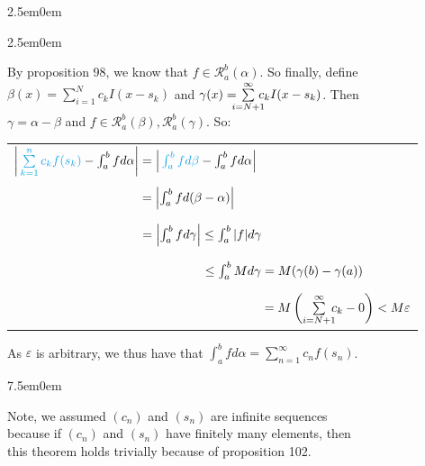 \documentclass{book}
\newcommand{\teachComment}{
   \color{Orange}%
   \fontsize{12}{14}\selectfont%
}
\newcommand{\cyPen}[1]{{\vphantom{.}\color{Cerulean}#1}}
\newenvironment{myIndent}{%
   \begin{adjustwidth}{2.5em}{0em}%
}{%
   \end{adjustwidth}%
}
\newenvironment{myTindent}{%
   \begin{adjustwidth}{7.5em}{0em}%
}{%
   \end{adjustwidth}%
}
\newcommand{\retTwo}{\hfill\bigbreak}
\begin{document}
{\begin{myIndent}
{\begin{myIndent}
      By proposition 98, we know that $f \in \mathscr{R}_a^b(\alpha)$. So finally, define\\
      $\beta(x) = \sum\limits_{i=1}^N c_k I(x - s_k)$ and $\gamma(x) = \hspace{-0.65em}\sum\limits_{i=N+1}^\infty\hspace{-0.65em} c_k I(x - s_k)$. Then\\ $\gamma = \alpha - \beta$ and $f \in \mathscr{R}_a^b(\beta), \mathscr{R}_a^b(\gamma)$. So:\\
      
      \begin{center}{\fontsize{12}{14}\selectfont
         \begin{tabular}{l}
            $\left|\cyPen{\sum\limits_{k=1}^n c_kf(s_k)}\vphantom{.} - \int_a^b fd\alpha\right| = \left| \cyPen{\int_a^b fd\beta}\vphantom{.} - \int_a^b fd\alpha \right|$\\ [8pt]
            
            $\phantom{\left|\cyPen{\sum\limits_{k=1}^n c_kf(s_k)}\vphantom{.} - \int_a^b fd\alpha\right|} = \left|\int_a^b fd(\beta - \alpha)\right|$\\ [8pt]

            $\phantom{\left|\cyPen{\sum\limits_{k=1}^n c_kf(s_k)}\vphantom{.} - \int_a^b fd\alpha\right|} = \left|\int_a^b fd\gamma\right| \leq \int_a^b|f|d\gamma$\\ [4pt]

            $\phantom{\left|\cyPen{\sum\limits_{k=1}^n c_kf(s_k)}\vphantom{.} - \int_a^b fd\alpha\right| = \left|\int_a^b fd\gamma\right|} \leq \int_a^bMd\gamma = M(\gamma(b) - \gamma(a))$\\ [4pt]

            $\phantom{\left|\cyPen{\sum\limits_{k=1}^n c_kf(s_k)}\vphantom{.} - \int_a^b fd\alpha\right| = \left|\int_a^b fd\gamma\right| \leq \int_a^bMd\gamma} = M\left(\hspace{0em}\sum\limits_{i=N+1}^\infty\hspace{-0.5em} c_k - 0\right) < M\varepsilon$
         \end{tabular}}
      \end{center}

      As $\varepsilon$ is arbitrary, we thus have that $\int_a^bfd\alpha = \sum\limits_{n=1}^\infty c_nf(s_n)$.\\ [-4pt]
      
      
      {\begin{myTindent}\teachComment
         Note, we assumed $(c_n)$ and $(s_n)$ are infinite sequences\\ because if $(c_n)$ and $(s_n)$ have finitely many elements, then\\ this theorem holds trivially because of proposition 102.
      \end{myTindent}}
      \retTwo
   \end{myIndent}}


\end{myIndent}}
\end{document}
